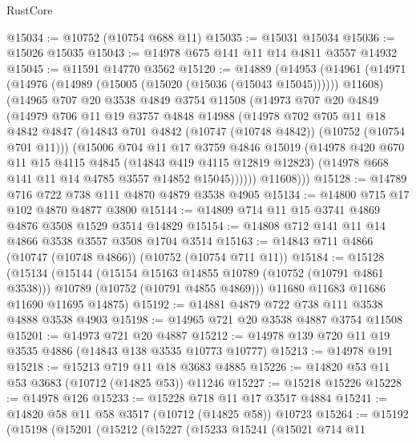 \begin{lexlean}{RustCore}
\begin{coremodule}
@15034 := @10752 (@10754 @688 @11)
@15035 := @15031 @15034
@15036 := @15026 @15035
@15043 := @14978 @675 @141 @11 @14 @4811 @3557 @14932
@15045 := @11591 @14770 @3562
@15120 := @14889
    (@14953
      (@14961
        (@14971 (@14976 (@14989 (@15005 (@15020 (@15036 (@15043 @15045)))))) @11608)
        (@14965
          @707
          @20
          @3538
          @4849
          @3754
          @11508
          (@14973
            @707
            @20
            @4849
            (@14979
              @706
              @11
              @19
              @3757
              @4848
              @14988
              (@14978
                @702
                @705
                @11
                @18
                @4842
                @4847
                (@14843 @701 @4842 (@10747 (@10748 @4842)) (@10752 (@10754 @701 @11)))
                (@15006
                  @704
                  @11
                  @17
                  @3759
                  @4846
                  @15019
                  (@14978
                    @420
                    @670
                    @11
                    @15
                    @4115
                    @4845
                    (@14843 @419 @4115 @12819 @12823)
                    (@14978 @668 @141 @11 @14 @4785 @3557 @14852 @15045))))))
          @11608)))
@15128 := @14789 @716 @722 @738 @111 @4870 @4879 @3538 @4905
@15134 := @14800 @715 @17 @102 @4870 @4877 @3800
@15144 := @14809 @714 @11 @15 @3741 @4869 @4876 @3508 @1529 @3514 @14829
@15154 := @14808 @712 @141 @11 @14 @4866 @3538 @3557 @3508 @1704 @3514
@15163 := @14843 @711 @4866 (@10747 (@10748 @4866)) (@10752 (@10754 @711 @11))
@15184 := @15128
    (@15134
      (@15144
        (@15154 @15163 @14855 @10789 (@10752 (@10791 @4861 @3538)))
        @10789
        (@10752 (@10791 @4855 @4869)))
      @11680
      @11683
      @11686
      @11690
      @11695
      @14875)
@15192 := @14881 @4879 @722 @738 @111 @3538 @4888 @3538 @4903
@15198 := @14965 @721 @20 @3538 @4887 @3754 @11508
@15201 := @14973 @721 @20 @4887
@15212 := @14978 @139 @720 @11 @19 @3535 @4886 (@14843 @138 @3535 @10773 @10777)
@15213 := @14978 @191
@15218 := @15213 @719 @11 @18 @3683 @4885
@15226 := @14820 @53 @11 @53 @3683 (@10712 (@14825 @53)) @11246
@15227 := @15218 @15226
@15228 := @14978 @126
@15233 := @15228 @718 @11 @17 @3517 @4884
@15241 := @14820 @58 @11 @58 @3517 (@10712 (@14825 @58)) @10723
@15264 := @15192
    (@15198
      (@15201
        (@15212
          (@15227
            (@15233
              @15241
              (@15021
                @714
                @11

\end{coremodule}
\end{lexlean}
